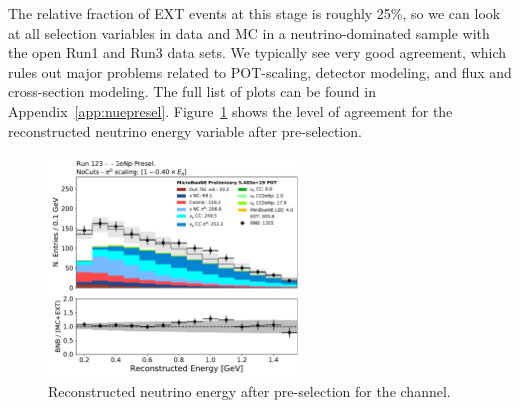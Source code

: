 The relative fraction of EXT events at this stage is roughly 25\%, so we can look at all selection variables in data and MC in a neutrino-dominated sample with the open Run1 and Run3 data sets. We typically see very good agreement, which rules out major problems related to POT-scaling, detector modeling, and flux and cross-section modeling. 
The full list of plots can be found in Appendix~\ref{app:nuepresel}. Figure~\ref{fig:1eNp:prsel} shows the level of agreement for the reconstructed neutrino energy variable after pre-selection. 

\begin{figure}[ht]
\begin{center}
\includegraphics[width=0.6\textwidth]{1eNp/reco_e_presel.pdf}
\caption{\label{fig:1eNp:prsel}Reconstructed neutrino energy after pre-selection for the \npsel channel.}
\end{center}
\end{figure}



